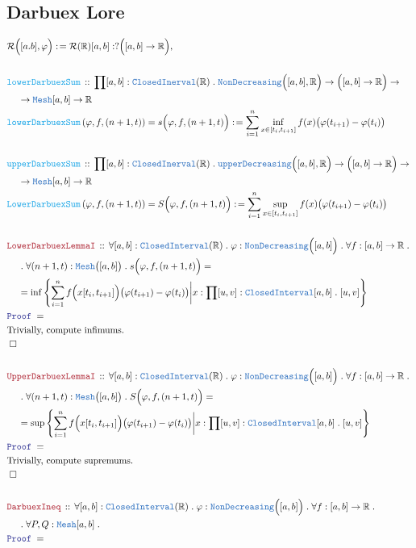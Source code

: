 \documentclass[12pt]{scrartcl}
\newcommand{\TYPE}[1]{\textcolor{NavyBlue}{\mathtt{#1}}}
\newcommand{\FUNC}[1]{\textcolor{Cerulean}{\mathtt{#1}}}
\newcommand{\LOGIC}[1]{\textcolor{Blue}{\mathtt{#1}}}
\newcommand{\THM}[1]{\textcolor{Maroon}{\mathtt{#1}}}
\renewcommand{\.}{\; . \;}
\newcommand{\de}{: \kern 0.1pc =}
\newcommand{\Act}[1]{\left( #1 \right)}
\newcommand{\Theorem}[2]{& \THM{#1} \, :: \, #2 \\ & \Proof = \\ }
\newcommand{\DeclareFunc}[2]{& \FUNC{#1} \, :: \, #2 \\}
\newcommand{\DefineNamedFunc}[4]{&  \FUNC{#1}\Act{#2} = #3 \de #4 \\}
\newcommand{\NewLine}{\\ & \kern 1pc}
\newcommand{\Page}[1]{ \begin{align*} #1 \end{align*}   }
\newcommand{\Reals}{\mathbb{R} }
\newcommand{\Say}[3]{& #1 \de #2 : #3, \\}
\newcommand{\QED}{\; \square}
\newcommand{\EndProof}{& \QED \\}
\newcommand{\Proof}{\LOGIC{Proof} \; }
\begin{document}
\subsection{Darbuex Lore}
\Page{
	\Say{\mathcal{R}\Big([a.b],\varphi\Big)}{\mathcal{R}(\Reals)[a,b]}{ ?\Big( [a,b] \to \Reals \Big)}
   	\\
	\DeclareFunc{lowerDarbuexSum}{ \prod [a,b] : \TYPE{ClosedInerval}(\Reals) \.   
		\TYPE{NonDecreasing}\Big([a,b],\Reals\Big) \to \Big([a,b] \to \Reals\Big) \to 
		 \NewLine
		 \to \TYPE{Mesh}[a,b] \to \Reals
	}
	\DefineNamedFunc{lowerDarbuexSum}{\varphi,f,(n+1,t)}{s\Big(\varphi,f,(n+1,t) \Big)}
	{ \sum^n_{i=1} \inf_{x \in [t_i,t_{i+1}]} f(x) \big(\varphi(t_{i+1}) - \varphi(t_{i})\big) }
	\\
	\DeclareFunc{upperDarbuexSum}{ \prod [a,b] : \TYPE{ClosedInerval}(\Reals) \.   
		\TYPE{upperDecreasing}\Big([a,b],\Reals\Big) \to \Big([a,b] \to \Reals\Big) \to 
		 \NewLine
		 \to \TYPE{Mesh}[a,b] \to \Reals
	}
	\DefineNamedFunc{LowerDarbuexSum}{\varphi,f,(n+1,t)}{S\Big(\varphi,f,(n+1,t) \Big)}
	{ \sum^n_{i=1} \sup_{x \in [t_i,t_{i+1}]} f(x) \big(\varphi(t_{i+1}) - \varphi(t_{i})\big) }
	\\
	\Theorem{LowerDarbuexLemmaI}{\forall [a,b] : \TYPE{ClosedInterval}(\Reals) \. 
		\varphi : \TYPE{NonDecreasing}\Big( [a,b] \Big) \. \forall f : [a,b] \to \Reals \. 
		\NewLine \.
		\forall (n+1,t) : \TYPE{Mesh}\big([a,b]\big) \.
		s\Big(\varphi, f, (n+1,t)\Big) = 
		 \NewLine =  \inf \left\{\sum^n_{i=1} f\Big(x[t_i,t_{i+1}]\Big)\big(\varphi(t_{i+1}) - \varphi(t_i)\big) 
		  \bigg|x : \prod [u,v] : \TYPE{ClosedInterval}[a,b] \. [u,v] \right\}      
		}
	& \text{Trivially, compute infimums.}\\
	\EndProof
	\\
	\Theorem{UpperDarbuexLemmaI}{\forall [a,b] : \TYPE{ClosedInterval}(\Reals) \. 
		\varphi : \TYPE{NonDecreasing}\Big( [a,b] \Big) \. \forall f : [a,b] \to \Reals \. 
		\NewLine \.
		\forall (n+1,t) : \TYPE{Mesh}\big([a,b]\big) \.
		S\Big(\varphi, f, (n+1,t)\Big) = 
		 \NewLine =  \sup \left\{\sum^n_{i=1} f\Big(x[t_i,t_{i+1}]\Big)\big(\varphi(t_{i+1}) - \varphi(t_i)\big) 
		  \bigg|x : \prod [u,v] : \TYPE{ClosedInterval}[a,b] \. [u,v] \right\}      
		}
	& \text{Trivially, compute supremums.}\\
	\EndProof
	\\
	\Theorem{DarbuexIneq}{\forall [a,b] : \TYPE{ClosedInterval}(\Reals) \. 
		\varphi : \TYPE{NonDecreasing}\Big( [a,b] \Big) \. \forall f : [a,b] \to \Reals \. 
		\NewLine \. 
		\forall P,Q : \TYPE{Mesh}[a,b] \. 
}}
\end{document}
